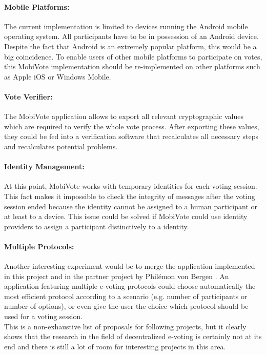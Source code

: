 \documentclass[numbers=noenddot, abstract=on, a4paper, headsepline,
footsepline, oneside, openright, draft=off, listof=leveldown]{scrreprt}
\begin{document}
\paragraph{Mobile Platforms:} The current implementation is limited to devices
running the Android mobile operating system. All participants have to be in
possession of an Android device. Despite the fact that Android is an extremely
popular platform, this would be a big coincidence. To enable users of other
mobile platforms to participate on votes, this MobiVote implementation should be
re-implemented on other platforms such as Apple iOS or Windows Mobile.

\paragraph{Vote Verifier:} The MobiVote application allows to export all
relevant cryptographic values which are required to verify the whole vote
process. After exporting these values, they could be fed into a verification
software that recalculates all necessary steps and recalculates potential
problems.

\paragraph{Identity Management:} At this point, MobiVote works with temporary
identities for each voting session. This fact makes it impossible to check the
integrity of messages after the voting session ended because the identity cannot
be assigned to a human participant or at least to a device. This issue could be
solved if MobiVote could use identity providers to assign a participant
distinctively to a identity.

\paragraph{Multiple Protocols:} Another interesting experiment would be to merge
the application implemented in this project and in the partner project by
Philémon von Bergen \cite{vonBergen14}. An application featuring multiple
e-voting protocols could choose automatically the most efficient protocol
according to a scenario (e.g. number of participants or number of options), or
even give the user the choice which protocol should be used for a voting
session.
\\

This is a non-exhaustive list of proposals for following projects, but it
clearly shows that the research in the field of decentralized e-voting is
certainly not at its end and there is still a lot of room for interesting
projects in this area.
\end{document}
